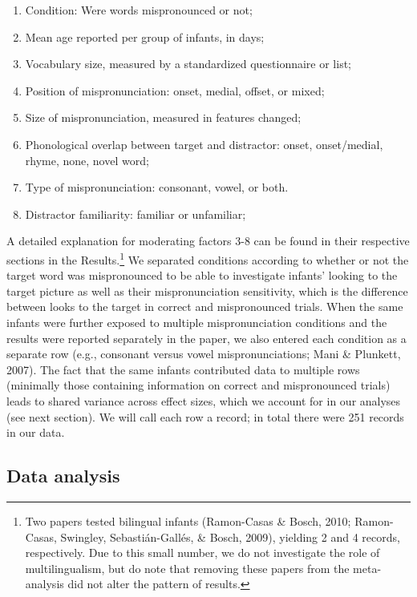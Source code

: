 \documentclass[man]{apa6}
\providecommand{\tightlist}{%
  \setlength{\itemsep}{0pt}\setlength{\parskip}{0pt}}
\let\rmarkdownfootnote\footnote%
\def\footnote{\protect\rmarkdownfootnote}
\begin{document}
\begin{enumerate}
\def\labelenumi{\arabic{enumi}.}
\tightlist
\item
  Condition: Were words mispronounced or not;\\
\item
  Mean age reported per group of infants, in days;\\
\item
  Vocabulary size, measured by a standardized questionnaire or list;
\item
  Position of mispronunciation: onset, medial, offset, or mixed;
\item
  Size of mispronunciation, measured in features changed;
\item
  Phonological overlap between target and distractor: onset, onset/medial, rhyme, none, novel word;
\item
  Type of mispronunciation: consonant, vowel, or both.
\item
  Distractor familiarity: familiar or unfamiliar;
\end{enumerate}

A detailed explanation for moderating factors 3-8 can be found in their respective sections in the Results.\footnote{Two papers tested bilingual infants (Ramon-Casas \& Bosch, 2010; Ramon-Casas, Swingley, Sebastián-Gallés, \& Bosch, 2009), yielding 2 and 4 records, respectively. Due to this small number, we do not investigate the role of multilingualism, but do note that removing these papers from the meta-analysis did not alter the pattern of results.} We separated conditions according to whether or not the target word was mispronounced to be able to investigate infants' looking to the target picture as well as their mispronunciation sensitivity, which is the difference between looks to the target in correct and mispronounced trials. When the same infants were further exposed to multiple mispronunciation conditions and the results were reported separately in the paper, we also entered each condition as a separate row (e.g., consonant versus vowel mispronunciations; Mani \& Plunkett, 2007). The fact that the same infants contributed data to multiple rows (minimally those containing information on correct and mispronounced trials) leads to shared variance across effect sizes, which we account for in our analyses (see next section). We will call each row a record; in total there were 251 records in our data.

\hypertarget{data-analysis}{%
\subsection{Data analysis}\label{data-analysis}}
\end{document}
